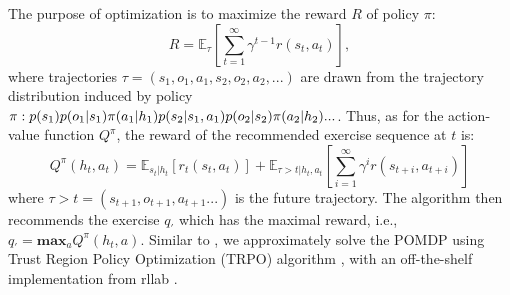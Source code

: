 \documentclass{edm_template}
\begin{document}
The purpose of optimization is to maximize the reward $R$ of policy $\pi$:
\begin{displaymath}
R = \mathbb{E}_{\tau}[\sum\limits_{t=1}^\infty\gamma^{t-1}r(s_t, a_t)],
\end{displaymath}
where trajectories $\tau = (s_1, o_1, a_1, s_2, o_2, a_2, ...)$ are drawn from the trajectory distribution induced by policy $\pi:p(s_1)\\p(o_1|s_1)\pi(a_1|h_1)p(s_2|s_1, a_1)p(o_2|s_2)\pi(a_2|h_2)...$.
Thus, as for the action-value function $Q^\pi$, the reward of the recommended exercise sequence at $t$ is:
\begin{displaymath}
Q^\pi(h_t, a_t) = \mathbb{E}_{s_t|h_t}[r_t(s_t, a_t)] + \mathbb{E}_{\tau > t|h_t, a_t}[\sum\limits_{i=1}^\infty\gamma^ir(s_{t+i}, a_{t+i})]
\end{displaymath}
where $\tau>t=(s_{t+1},o_{t+1},a_{t+1}...)$ is the future trajectory.
The algorithm then recommends the exercise $q_{'}$ which has the maximal reward, i.e.,
$q_{'} = \textbf{max}_aQ^\pi(h_t, a)$.
Similar to \cite{acc}, we approximately solve the POMDP using Trust Region Policy Optimization (TRPO) algorithm \cite{trpo}, with an off-the-shelf implementation from rllab \cite{rllab}.
\end{document}
